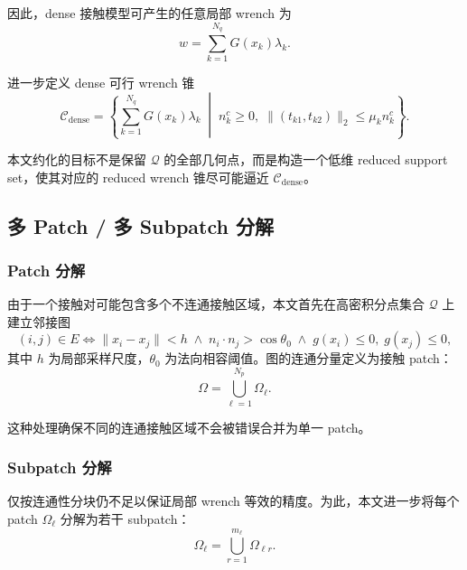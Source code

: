 \documentclass[UTF8,a4paper,11pt]{ctexart}
\begin{document}
因此，dense 接触模型可产生的任意局部 wrench 为
\begin{equation}
 w = \sum_{k=1}^{N_q} G(x_k)\lambda_k.
\end{equation}

进一步定义 dense 可行 wrench 锥
\begin{equation}
\mathcal{C}_{\mathrm{dense}}
=
\left\{
\sum_{k=1}^{N_q} G(x_k)\lambda_k
\;\middle|\;
 n_k^c \ge 0,\;
 \|(t_{k1},t_{k2})\|_2 \le \mu_k n_k^c
\right\}.
\end{equation}

本文约化的目标不是保留 $\mathcal{Q}$ 的全部几何点，而是构造一个低维 reduced support set，使其对应的 reduced wrench 锥尽可能逼近 $\mathcal{C}_{\mathrm{dense}}$。

\subsection{多 Patch / 多 Subpatch 分解}

\subsubsection{Patch 分解}

由于一个接触对可能包含多个不连通接触区域，本文首先在高密积分点集合 $\mathcal{Q}$ 上建立邻接图
\begin{equation}
(i,j)\in E
\iff
\|x_i - x_j\| < h
\;\land\;
n_i \cdot n_j > \cos\theta_0
\;\land\;
g(x_i)\le 0,\; g(x_j)\le 0,
\end{equation}
其中 $h$ 为局部采样尺度，$\theta_0$ 为法向相容阈值。图的连通分量定义为接触 patch：
\begin{equation}
\Omega = \bigcup_{\ell=1}^{N_p} \Omega_\ell.
\end{equation}

这种处理确保不同的连通接触区域不会被错误合并为单一 patch。

\subsubsection{Subpatch 分解}

仅按连通性分块仍不足以保证局部 wrench 等效的精度。为此，本文进一步将每个 patch $\Omega_\ell$ 分解为若干 subpatch：
\begin{equation}
\Omega_\ell = \bigcup_{r=1}^{m_\ell} \Omega_{\ell r}.
\end{equation}
\end{document}
